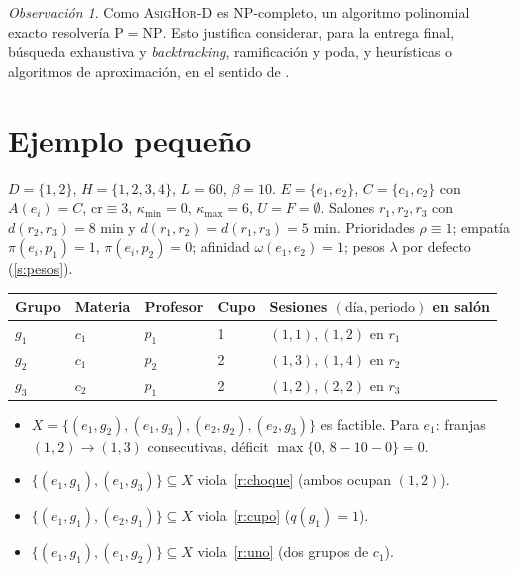 \documentclass[11pt,letterpaper]{article}
\theoremstyle{definition}
\theoremstyle{remark}
\newtheorem*{obs}{Observación}
\theoremstyle{plain}
\begin{document}
\begin{obs}
Como \textsc{AsigHor-D} es NP-completo, un algoritmo polinomial exacto
resolvería $\mathrm{P}=\mathrm{NP}$. Esto justifica considerar, para la
entrega final, búsqueda exhaustiva y \emph{backtracking}, ramificación y
poda, y heurísticas o algoritmos de aproximación, en el sentido de
\cite[§§3.4, 12.1--12.3]{levitin}.
\end{obs}

\section{Ejemplo pequeño}\label{sec:ejemplo}
$D=\{1,2\}$, $H=\{1,2,3,4\}$, $L=60$, $\beta=10$.
$E=\{e_1,e_2\}$, $C=\{c_1,c_2\}$ con $A(e_i)=C$, $\mathrm{cr}\equiv 3$,
$\kappa_{\min}=0$, $\kappa_{\max}=6$, $U=F=\emptyset$. Salones $r_1,r_2,r_3$
con $d(r_2,r_3)=8$ min y $d(r_1,r_2)=d(r_1,r_3)=5$ min. Prioridades
$\rho\equiv1$; empatía $\pi(e_i,p_1)=1$, $\pi(e_i,p_2)=0$; afinidad
$\omega(e_1,e_2)=1$; pesos $\lambda$ por defecto (\ref{s:pesos}).

\begin{center}
\begin{tabular}{lllll}
\toprule
Grupo & Materia & Profesor & Cupo & Sesiones $(\text{día},\text{periodo})$ en salón \\
\midrule
$g_1$ & $c_1$ & $p_1$ & 1 & $(1,1),(1,2)$ en $r_1$ \\
$g_2$ & $c_1$ & $p_2$ & 2 & $(1,3),(1,4)$ en $r_2$ \\
$g_3$ & $c_2$ & $p_1$ & 2 & $(1,2),(2,2)$ en $r_3$ \\
\bottomrule
\end{tabular}
\end{center}

\begin{itemize}[nosep]
  \item $X=\{(e_1,g_2),(e_1,g_3),(e_2,g_2),(e_2,g_3)\}$ es factible.
        Para $e_1$: franjas $(1,2)\to(1,3)$ consecutivas, déficit
        $\max\{0,\,8-10-0\}=0$.
  \item $\{(e_1,g_1),(e_1,g_3)\}\subseteq X$ viola~\ref{r:choque}
        (ambos ocupan $(1,2)$).
  \item $\{(e_1,g_1),(e_2,g_1)\}\subseteq X$ viola~\ref{r:cupo} ($q(g_1)=1$).
  \item $\{(e_1,g_1),(e_1,g_2)\}\subseteq X$ viola~\ref{r:uno} (dos grupos de $c_1$).
\end{itemize}
\end{document}

